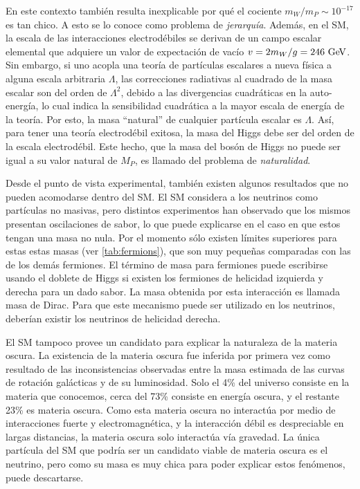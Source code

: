 En este contexto también resulta inexplicable por qué el cociente $m_W/m_P \sim
10^{-17}$ es tan chico. A esto se lo conoce como problema de \emph{jerarquía}.
Además, en el SM, la escala de las interacciones electrodébiles se derivan de un
campo escalar elemental que adquiere un valor de expectación de vacío $v = 2
m_W /g = 246 \gev$. Sin embargo, si uno acopla una teoría de partículas
escalares a nueva física a alguna escala arbitraria $\Lambda$, las correcciones
radiativas al cuadrado de la masa escalar son del orden de $\Lambda^2$, debido a
las divergencias cuadráticas en la auto-energía, lo cual indica la sensibilidad
cuadrática a la mayor escala de energía de la teoría. Por esto, la masa
``natural'' de cualquier partícula escalar es $\Lambda$. Así, para tener una teoría
electrodébil exitosa, la masa del Higgs debe ser del orden de la escala
electrodébil. Este hecho, que la masa del bosón de Higgs no puede ser igual a su
valor natural de $M_P$, es llamado del problema de \emph{naturalidad}.

Desde el punto de vista experimental, también existen algunos resultados que no
pueden acomodarse dentro del SM. El SM considera a los neutrinos como partículas
no masivas, pero distintos
experimentos\cite{PhysRevLett.101.111301,PhysRevD.78.032002} han observado
que los mismos presentan oscilaciones de sabor, lo que puede explicarse en el caso en
que estos tengan una masa no nula. Por el momento sólo existen límites
superiores para estas estas masas (ver \cref{tab:fermions}), que son muy peque\~nas
comparadas con las de los demás fermiones. El término de
masa para fermiones puede escribirse usando el doblete de Higgs si existen los
fermiones de helicidad izquierda y derecha para un dado sabor. La masa obtenida
por esta interacción es llamada masa de Dirac. Para que este mecanismo puede ser
utilizado en los neutrinos, deberían existir los neutrinos de helicidad derecha.

El SM tampoco provee un candidato para explicar la naturaleza de la materia
oscura. La existencia de la materia oscura fue inferida por primera vez como
resultado de las inconsistencias observadas entre la masa estimada de las curvas
de rotación galácticas y de su luminosidad\cite{DM1}.
Solo el 4\% del universo consiste en la materia que
conocemos\cite{DM2}, cerca del 73\% consiste en energía oscura, y el restante
23\% es materia oscura. Como esta materia oscura no interactúa por medio de
interacciones fuerte y electromagnética, y la interacción débil es despreciable
en largas distancias, la materia oscura solo interactúa vía gravedad. La única
partícula del SM que podría ser un candidato viable de materia oscura es el
neutrino, pero como su masa es muy chica para poder explicar estos fenómenos,
puede descartarse.

